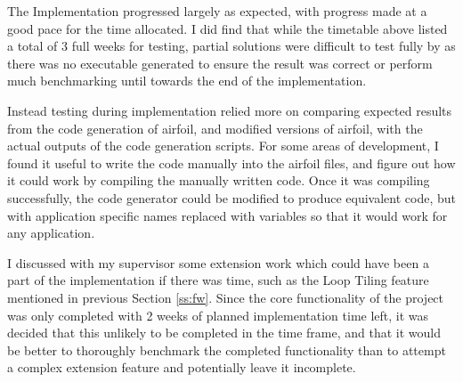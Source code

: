 The Implementation progressed largely as expected, with progress made at a good pace for the time allocated. I did find that while the timetable above listed a total of 3 full weeks for testing, partial solutions were difficult to test fully by as there was no executable generated to ensure the result was correct or perform much benchmarking until towards the end of the implementation.
\par
Instead testing during implementation relied more on comparing expected results from the code generation of airfoil, and modified versions of airfoil, with the actual outputs of the code generation scripts. For some areas of development, I found it useful to write the code manually into the airfoil files, and figure out how it could work by compiling the manually written code. Once it was compiling successfully, the code generator could be modified to produce equivalent code, but with application specific names replaced with variables so that it would work for any application.
\par
I discussed with my supervisor some extension work which could have been a part of the implementation if there was time, such as the Loop Tiling feature mentioned in previous Section \ref{ss:fw}. Since the core functionality of the project was only completed with 2 weeks of planned implementation time left, it was decided that this unlikely to be completed in the time frame, and that it would be better to thoroughly benchmark the completed functionality than to attempt a complex extension feature and potentially leave it incomplete.

